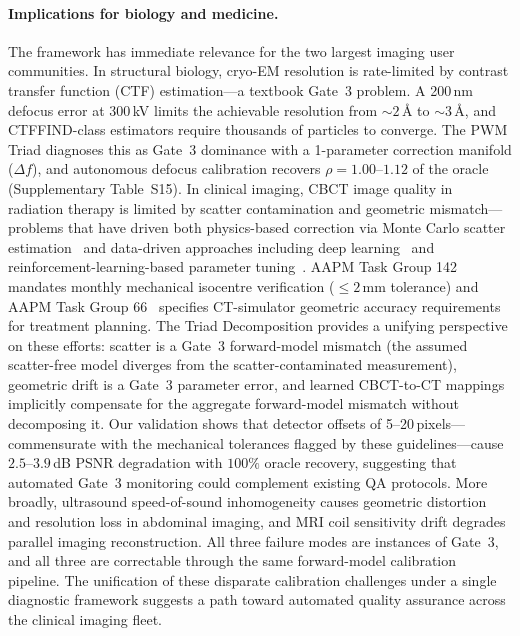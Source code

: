 \documentclass[11pt]{article}
\newcommand{\recoveryratio}{\rho}
\begin{document}
\paragraph{Implications for biology and medicine.}
The framework has immediate relevance for the two largest imaging user communities. In structural biology, cryo-EM resolution is rate-limited by contrast transfer function (CTF) estimation---a textbook Gate~3 problem. A 200\,nm defocus error at 300\,kV limits the achievable resolution from ${\sim}2$\,\AA{} to ${\sim}3$\,\AA{}, and CTFFIND-class estimators require thousands of particles to converge. The PWM Triad diagnoses this as Gate~3 dominance with a 1-parameter correction manifold ($\Delta f$), and autonomous defocus calibration recovers $\recoveryratio = 1.00$--$1.12$ of the oracle (Supplementary Table~S15). In clinical imaging, CBCT image quality in radiation therapy is limited by scatter contamination and geometric mismatch---problems that have driven both physics-based correction via Monte Carlo scatter estimation~\cite{xu2015cbct} and data-driven approaches including deep learning~\cite{liang2019cyclegan} and reinforcement-learning-based parameter tuning~\cite{shen2018drl}. AAPM Task Group 142~\cite{klein2009tg142} mandates monthly mechanical isocentre verification ($\leq 2$\,mm tolerance) and AAPM Task Group 66~\cite{mutic2003tg66} specifies CT-simulator geometric accuracy requirements for treatment planning. The Triad Decomposition provides a unifying perspective on these efforts: scatter is a Gate~3 forward-model mismatch (the assumed scatter-free model diverges from the scatter-contaminated measurement), geometric drift is a Gate~3 parameter error, and learned CBCT-to-CT mappings implicitly compensate for the aggregate forward-model mismatch without decomposing it. Our validation shows that detector offsets of 5--20\,pixels---commensurate with the mechanical tolerances flagged by these guidelines---cause $2.5$--$3.9$\,dB PSNR degradation with $100\%$ oracle recovery, suggesting that automated Gate~3 monitoring could complement existing QA protocols. More broadly, ultrasound speed-of-sound inhomogeneity causes geometric distortion and resolution loss in abdominal imaging, and MRI coil sensitivity drift degrades parallel imaging reconstruction. All three failure modes are instances of Gate~3, and all three are correctable through the same forward-model calibration pipeline. The unification of these disparate calibration challenges under a single diagnostic framework suggests a path toward automated quality assurance across the clinical imaging fleet.
\end{document}
